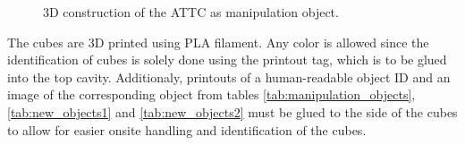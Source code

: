 \begin{figure}[h!]
	\centering
	\hspace{0.05\textwidth}
	\caption{3D construction of the ATTC as manipulation object.}%
	\label{fig:cubeObject}
\end{figure}

The cubes are 3D printed using PLA filament. Any color is allowed since the identification of cubes is solely done using the printout tag, which is to be glued into the top cavity.
Additionaly, printouts of a human-readable object ID and an image of the corresponding object from tables \ref{tab:manipulation_objects}, \ref{tab:new_objects1} and \ref{tab:new_objects2} must be glued to the side of the cubes to allow for easier onsite handling and identification of the cubes.

